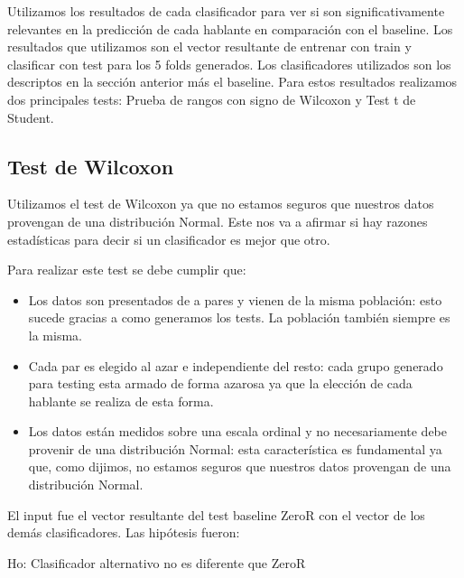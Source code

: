Utilizamos los resultados de cada clasificador para ver si son significativamente relevantes en la predicción de cada hablante en comparación con el baseline. Los resultados que utilizamos son el vector resultante de entrenar con train y clasificar con test para los 5 folds  generados. Los clasificadores utilizados son los descriptos en la sección anterior más el baseline. Para estos resultados realizamos dos principales tests: Prueba de rangos con signo de Wilcoxon y Test t de Student. 

\subsection{Test de Wilcoxon}

Utilizamos el test de Wilcoxon ya que no estamos seguros que nuestros datos provengan de una distribución Normal. Este nos va a afirmar si hay razones estadísticas para decir si un clasificador es mejor que otro.

Para realizar este test se debe cumplir que:

\begin{itemize}
    \item Los datos son presentados de a pares y vienen de la misma población: esto sucede gracias a como generamos los tests. La población también siempre es la misma.
    \item Cada par es elegido al azar e independiente del resto: cada grupo generado para testing esta armado de forma azarosa ya que la elección de cada hablante se realiza de esta forma.
    \item Los datos están medidos sobre una escala ordinal y no necesariamente debe provenir de una distribución Normal: esta característica es fundamental ya que, como dijimos, no estamos seguros que nuestros datos provengan de una distribución Normal.
\end{itemize}

El input fue el vector resultante del test baseline ZeroR con el vector de los demás clasificadores. Las hipótesis fueron:

\vspace{0.5cm}
\hspace{2cm}Ho: Clasificador alternativo no es diferente que ZeroR
\vspace{0.25cm}

